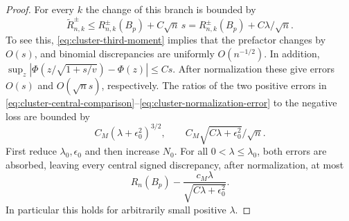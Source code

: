 \documentclass[aop]{imsart}
\theoremstyle{plain}
\theoremstyle{definition}
\theoremstyle{definition}
\begin{document}
\begin{proof}
For every $k$ the change of this branch is bounded by
\begin{equation}\label{eq:cluster-normalization-error}
 \widetilde R^\pm_{n,k}
 \le R^\pm_{n,k}(B_p)+C\sqrt n\,s
 =R^\pm_{n,k}(B_p)+C\lambda/\sqrt n.
\end{equation}
To see this, \eqref{eq:cluster-third-moment} implies that the prefactor
changes by $O(s)$, and binomial discrepancies are uniformly
$O(n^{-1/2})$. In addition,
$\sup_z|\Phi(z/\sqrt{1+s/v})-\Phi(z)|\le Cs$.
After normalization these give errors $O(s)$ and $O(\sqrt n s)$,
respectively. The ratios of the two positive errors in
\eqref{eq:cluster-central-comparison}--\eqref{eq:cluster-normalization-error}
to the negative loss are bounded by
\[
 C_M(\lambda+\epsilon_0^2)^{3/2},\qquad
 C_M\sqrt{C\lambda+\epsilon_0^2}/\sqrt n.
\]
First reduce $\lambda_0,\epsilon_0$ and then increase $N_0$.
For all $0<\lambda\le\lambda_0$, both errors are absorbed, leaving
every central signed discrepancy, after normalization, at most
\begin{equation}\label{eq:cluster-strict-central}
 R_n(B_p)-\frac{c_M\lambda}{\sqrt{C\lambda+\epsilon_0^2}}.
\end{equation}
In particular this holds for arbitrarily small positive $\lambda$.


\end{proof}
\end{document}
